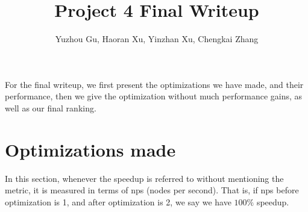 \documentclass[10pt,twosidep]{article}
\begin{document}
\pagestyle{fancy}

\setlength{\parindent}{2em}
\setlength{\footskip}{30pt}
\setlength{\baselineskip}{1.3\baselineskip}


\newcommand{\tgreen}[1]{\textcolor{fgreen}{#1}}
\newcommand{\tred}[1]{\textcolor{dred}{#1}}

\newcommand{\scs}{{\tt scout\_search}\xspace}

\title{Project 4 Final Writeup}
\author{Yuzhou Gu, Haoran Xu, Yinzhan Xu, Chengkai Zhang}
\maketitle{}

For the final writeup, we first present the optimizations we have made, and their performance, then we give the optimization without much performance gains, as well as our final ranking.  



\section{Optimizations made}
In this section, whenever the speedup is referred to without mentioning the metric, it is measured in terms of nps (nodes per second). That is, if nps before optimization is 1, and after optimization is 2, we say we have $100\%$ speedup.
\end{document}

